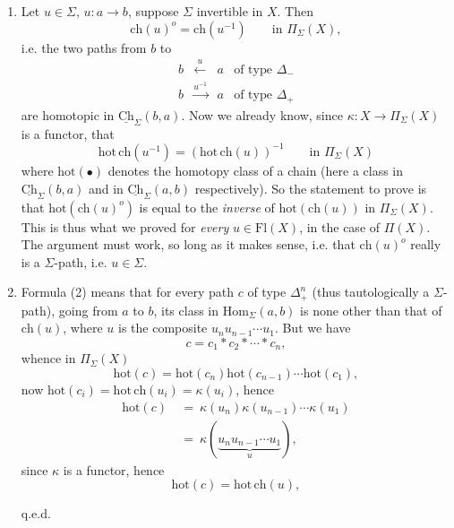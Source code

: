 \documentclass[11pt]{article}
\newcommand{\printedpage}[1]{\marginpar{\footnotesize p.~#1}}
\newcommand{\msp}[1]{\marginpar{\footnotesize [#1]}}
\newcommand{\Ch}{\underline{\mathrm{Ch}}}
\newcommand{\Fl}{\mathrm{Fl}}
\newcommand{\Hom}{\mathrm{Hom}}
\newcommand{\ch}{\mathrm{ch}}
\newcommand{\hot}{\mathrm{hot}}
\begin{document}
\begin{enumerate}[label={}]
\item[$1^o$)] Let $u \in \Sigma$, $u : a \longrightarrow b$, suppose $\Sigma$ invertible in $X$. Then
\[
\ch(u)^o = \ch(u^{-1}) \qquad \text{in } \Pi_\Sigma(X),
\]
i.e. the two paths from $b$ to
\[
\begin{array}{cccl}
b & \xleftarrow{\ u\ } & a & \text{of type } \Delta_- \\
b & \xrightarrow{u^{-1}} & a & \text{of type } \Delta_+
\end{array}
\]
\printedpage{47}
are homotopic in $\Ch_\Sigma(b,a)$. Now we already know, since $\kappa : X \longrightarrow \Pi_\Sigma(X)$ is a functor, that
\[
\hot\,\ch(u^{-1}) = (\hot\,\ch(u))^{-1} \qquad \text{in } \Pi_\Sigma(X)
\]
where $\hot(\bullet)$ denotes the homotopy class of a chain (here a class in $\Ch_\Sigma(b,a)$ and in $\Ch_\Sigma(a,b)$ respectively). So the statement to prove is that $\hot(\ch(u)^o)$ is equal to the \textit{inverse} of $\hot(\ch(u))$ in $\Pi_\Sigma(X)$. This is thus what we proved for \textit{every} $u \in \Fl(X)$, in the case of $\Pi(X)$. The argument must work, so long as it makes sense, i.e. that $\ch(u)^o$ really is a $\Sigma$-path, i.e. $u \in \Sigma$.

\item[$2^o$)] Formula (2) means that for every path $c$ of type $\Delta_+^n$ (thus tautologically a \msp{page 71} $\Sigma$-path), going from $a$ to $b$, its class in $\Hom_\Sigma(a,b)$ is none other than that of $\ch(u)$, where $u$ is the composite $u_nu_{n-1}\cdots u_1$. But we have
\[
c = c_1 * c_2 * \cdots * c_n,
\]
whence in $\Pi_\Sigma(X)$
\[
\hot(c) = \hot(c_n)\hot(c_{n-1})\cdots\hot(c_1),
\]
now $\hot(c_i) = \hot\,\ch(u_i) = \kappa(u_i)$, hence
\[
\begin{aligned}
\hot(c) \ &= \ \kappa(u_n)\kappa(u_{n-1})\cdots\kappa(u_1) \\
&= \ \kappa(\underbrace{u_nu_{n-1}\cdots u_1}_{u}),
\end{aligned}
\]
since $\kappa$ is a functor, hence
\[
\hot(c) = \hot\,\ch(u),
\]

\hfill q.e.d.
\end{enumerate}
\end{document}
